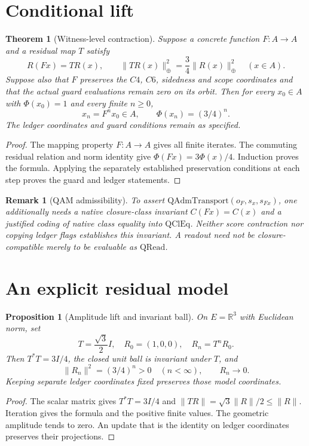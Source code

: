 \documentclass[11pt,a4paper]{article}
\newtheorem{proposition}{Proposition}
\newtheorem{theorem}{Theorem}
\newtheorem{remark}{Remark}
\begin{document}
\section{Conditional lift}
\begin{theorem}[Witness-level contraction]
Suppose a concrete function $F:A\to A$ and a residual map $T$ satisfy
\[
R(Fx)=TR(x),\qquad \|TR(x)\|_\oplus^2=\frac34\|R(x)\|_\oplus^2
\quad(x\in A).
\]
Suppose also that $F$ preserves the $C4$, $C6$, sidedness and scope
coordinates and that the actual guard evaluations remain zero on its orbit.
Then for every $x_0\in A$ with $\Phi(x_0)=1$ and every finite $n\ge0$,
\[
x_n=F^n x_0\in A,\qquad \Phi(x_n)=(3/4)^n.
\]
The ledger coordinates and guard conditions remain as specified.
\end{theorem}
\begin{proof}
The mapping property $F:A\to A$ gives all finite iterates. The commuting
residual relation and norm identity give $\Phi(Fx)=3\Phi(x)/4$.
Induction proves the formula. Applying the separately established preservation
conditions at each step proves the guard and ledger statements.
\end{proof}

\begin{remark}[QAM admissibility]
To assert $\mathrm{QAdmTransport}(o_F,s_x,s_{Fx})$, one additionally needs a
native closure-class invariant $C(Fx)=C(x)$ and a justified coding of native
class equality into $\mathrm{QClEq}$. Neither score contraction nor copying
ledger flags establishes this invariant. A readout need not be
closure-compatible merely to be evaluable as $\mathrm{QRead}$.
\end{remark}

\section{An explicit residual model}
\begin{proposition}[Amplitude lift and invariant ball]
On $E=\mathbb R^3$ with Euclidean norm, set
\[
T=\frac{\sqrt3}{2}I,\quad R_0=(1,0,0),\quad R_n=T^nR_0.
\]
Then $T^*T=3I/4$, the closed unit ball is invariant under $T$, and
\[
\|R_n\|^2=(3/4)^n>0\quad(n<\infty),\qquad R_n\longrightarrow0.
\]
Keeping separate ledger coordinates fixed preserves those model coordinates.
\end{proposition}
\begin{proof}
The scalar matrix gives $T^*T=3I/4$ and
$\|TR\|=\sqrt3\|R\|/2\le\|R\|$. Iteration gives the formula and the
positive finite values. The geometric amplitude tends to zero. An update
that is the identity on ledger coordinates preserves their projections.
\end{proof}
\end{document}
